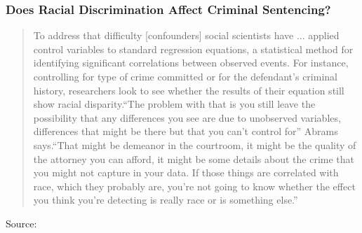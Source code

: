 \documentclass[handout]{beamer}
\begin{document}
\begin{frame}
\frametitle{Does Racial Discrimination  Affect Criminal Sentencing?}
	\footnotesize
	\begin{quote}
		To address that difficulty [confounders] social scientists have ... applied control variables to standard regression equations, a statistical method for identifying significant correlations between observed events. For instance, controlling for type of crime committed or for the defendant’s criminal history, researchers look to see whether the results of their equation still show racial disparity.\alert{``The problem with that is you still leave the possibility that any differences you see are due to unobserved variables, differences that might be there but that you can't control for''} Abrams says.``That might be demeanor in the courtroom, it might be the quality of the attorney you can afford, it might be some details about the crime that you might not capture in your data. If those things are correlated with race, which they probably are, you're not going to know whether the effect you think you're detecting is really race or is something else.''
	\end{quote}
	
	\tiny{Source: \href{https://www.law.upenn.edu/live/news/2170-new-study-by-professor-david-s-abrams-confirms}{}}
\end{frame}

\end{document}
